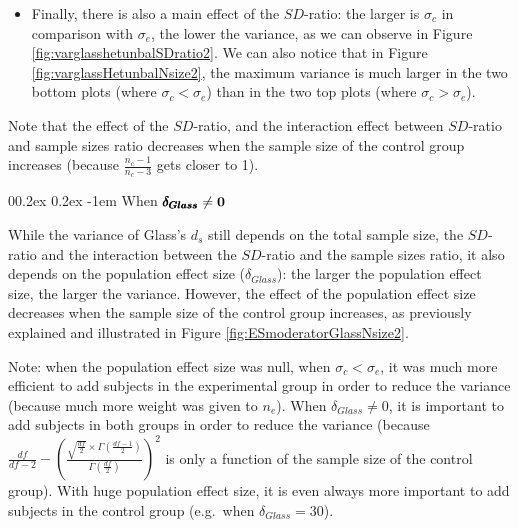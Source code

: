 \documentclass[
  english,
  man,mask]{apa6}
\makeatletter
\providecommand{\tightlist}{%
  \setlength{\itemsep}{0pt}\setlength{\parskip}{0pt}}
\let\oldparagraph\paragraph
\renewcommand{\paragraph}[1]{\oldparagraph{#1}\mbox{}}
\renewcommand{\paragraph}{\@startsection{paragraph}{4}{\parindent}%
  {0\baselineskip \@plus 0.2ex \@minus 0.2ex}%
  {-1em}%
  {\normalfont\normalsize\bfseries\itshape\typesectitle}}
\makeatother
\begin{document}
\begin{itemize}
\tightlist
\item
  Finally, there is also a main effect of the \(SD\)-ratio: the larger is \(\sigma_c\) in comparison with \(\sigma_e\), the lower the variance, as we can observe in Figure \ref{fig:varglasshetunbalSDratio2}. We can also notice that in Figure \ref{fig:varglassHetunbalNsize2}, the maximum variance is much larger in the two bottom plots (where \(\sigma_c<\sigma_e\)) than in the two top plots (where \(\sigma_c>\sigma_e\)).
\end{itemize}

Note that the effect of the \(SD\)-ratio, and the interaction effect between \(SD\)-ratio and sample sizes ratio decreases when the sample size of the control group increases (because \(\frac{n_c-1}{n_c-3}\) gets closer to 1).

\hypertarget{when-bf-pmbdelta_glass-neq-0-2}{%
\paragraph{\texorpdfstring{When \(\bf \pmb{\delta_{Glass}} \neq 0\)}{When \textbackslash bf \textbackslash pmb\{\textbackslash delta\_\{Glass\}\} \textbackslash neq 0}}\label{when-bf-pmbdelta_glass-neq-0-2}}

While the variance of Glass's \(d_s\) still depends on the total sample size, the \(SD\)-ratio and the interaction between the \(SD\)-ratio and the sample sizes ratio, it also depends on the population effect size (\(\delta_{Glass}\)): the larger the population effect size, the larger the variance. However, the effect of the population effect size decreases when the sample size of the control group increases, as previously explained and illustrated in Figure \ref{fig:ESmoderatorGlassNsize2}.

Note: when the population effect size was null, when \(\sigma_c<\sigma_e\), it was much more efficient to add subjects in the experimental group in order to reduce the variance (because much more weight was given to \(n_e\)). When \(\delta_{Glass} \neq 0\), it is important to add subjects in both groups in order to reduce the variance (because \(\frac{df}{df-2} - \left( \frac{\sqrt{\frac{df}{2}} \times \Gamma \left(\frac{df-1}{2} \right)}{\Gamma \left( \frac{df}{2}\right)}\right)^2\) is only a function of the sample size of the control group). With huge population effect size, it is even always more important to add subjects in the control group (e.g.~when \(\delta_{Glass}=30\)).
\end{document}
